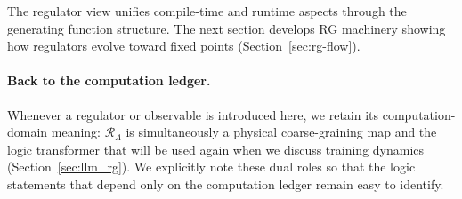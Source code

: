 The regulator view unifies compile-time and runtime aspects through the generating function structure. The next section develops RG machinery showing how regulators evolve toward fixed points (Section~\ref{sec:rg-flow}).

\paragraph{Back to the computation ledger.} Whenever a regulator or observable is introduced here, we retain its computation-domain meaning: $\mathcal{R}_\Lambda$ is simultaneously a physical coarse-graining map and the logic transformer that will be used again when we discuss training dynamics (Section~\ref{sec:llm_rg}). We explicitly note these dual roles so that the logic statements that depend only on the computation ledger remain easy to identify.
